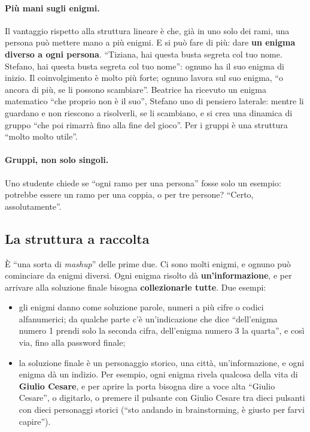 \paragraph{Più mani sugli enigmi.} Il vantaggio rispetto alla struttura lineare è che,
già in uno solo dei rami, una persona può mettere mano a più enigmi. E si può fare di
più: dare \textbf{un enigma diverso a ogni persona}. ``Tiziana, hai questa busta
segreta col tuo nome. Stefano, hai questa busta segreta col tuo nome'': ognuno ha il
suo enigma di inizio. Il coinvolgimento è molto più forte; ognuno lavora sul suo
enigma, ``o ancora di più, se li possono scambiare''. Beatrice ha ricevuto un enigma
matematico ``che proprio non è il suo'', Stefano uno di pensiero laterale: mentre li
guardano e non riescono a risolverli, se li scambiano, e si crea una dinamica di gruppo
``che poi rimarrà fino alla fine del gioco''. Per i gruppi è una struttura ``molto
molto utile''.

\paragraph{Gruppi, non solo singoli.} Uno studente chiede se ``ogni ramo per una
persona'' fosse solo un esempio: potrebbe essere un ramo per una coppia, o per tre
persone? ``Certo, assolutamente''.

\subsection{La struttura a raccolta}

È ``una sorta di \emph{mashup}'' delle prime due. Ci sono molti enigmi, e ognuno può
cominciare da enigmi diversi. Ogni enigma risolto dà \textbf{un'informazione}, e per
arrivare alla soluzione finale bisogna \textbf{collezionarle tutte}. Due esempi:
\begin{itemize}
  \item gli enigmi danno come soluzione parole, numeri a più cifre o codici
        alfanumerici; da qualche parte c'è un'indicazione che dice ``dell'enigma
        numero 1 prendi solo la seconda cifra, dell'enigma numero 3 la quarta'', e
        così via, fino alla password finale;
  \item la soluzione finale è un personaggio storico, una città, un'informazione, e
        ogni enigma dà un indizio. Per esempio, ogni enigma rivela qualcosa della vita
        di \textbf{Giulio Cesare}, e per aprire la porta bisogna dire a voce alta
        ``Giulio Cesare'', o digitarlo, o premere il pulsante con Giulio Cesare tra
        dieci pulsanti con dieci personaggi storici (``sto andando in brainstorming, è
        giusto per farvi capire'').
\end{itemize}

